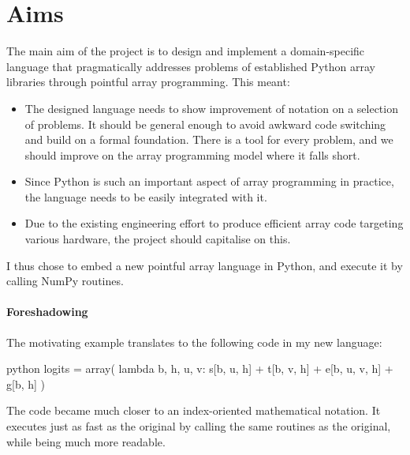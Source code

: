 \section{Aims}

The main aim of the project is to design and implement a domain-specific language that pragmatically addresses problems of established Python array libraries through pointful array programming. This meant:
\begin{itemize}
    \item The designed language needs to show improvement of notation on a selection of problems. It should be general enough to avoid awkward code switching and build on a formal foundation. There is a tool for every problem, and we should improve on the array programming model where it falls short. 
    \item Since Python is such an important aspect of array programming in practice, the language needs to be easily integrated with it. 
    \item Due to the existing engineering effort to produce efficient array code targeting various hardware, the project should capitalise on this.
\end{itemize}
I thus chose to embed a new pointful array language in Python, and execute it by calling NumPy routines.

\paragraph{Foreshadowing} The motivating example translates to the following code in my new language:
\begin{center}
\begin{cminted}{python}
logits = array(
    lambda b, h, u, v: s[b, u, h] + t[b, v, h] + e[b, u, v, h] + g[b, h]
)
\end{cminted}
\end{center}
The code became much closer to an index-oriented mathematical notation. It executes just as fast as the original by calling the same routines as the original, while being much more readable.
